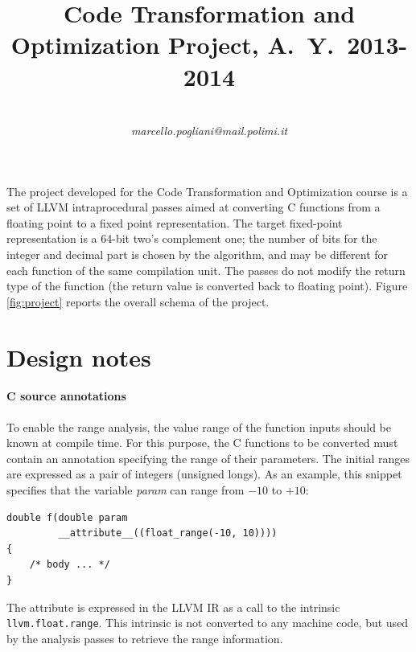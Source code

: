 \documentclass[9pt,twocolumn,a4paper]{scrartcl}
\title{Code Transformation and Optimization Project, A.~Y.~2013-2014}
\author{\realauthor \\[.3em]
        {\normalsize\itshape marcello.pogliani@mail.polimi.it}}
\begin{document}
\maketitle
\thispagestyle{empty}
\pagestyle{empty}

The project developed for the Code Transformation and Optimization course is a
set of LLVM intraprocedural passes aimed at converting C functions from a
floating point to a fixed point representation.
The target fixed-point representation is a 64-bit two's complement one; the
number of bits for the integer and decimal part is chosen by the algorithm, and
may be different for each function of the same compilation unit.
The passes do not modify the return type of the function (the return value is
converted back to floating point).
Figure \ref{fig:project} reports the overall schema of the project.

\section{Design notes}

\paragraph{C source annotations} To enable the range analysis, the value range
of the function inputs should be known at compile time.
For this purpose, the C functions to be converted must contain an annotation
specifying the range of their parameters.
The initial ranges are expressed as a pair of integers (unsigned longs).
As an example, this snippet specifies that the variable \emph{param} can range
from $-10$ to $+10$:
\begin{verbatim}
double f(double param
         __attribute__((float_range(-10, 10))))
{
    /* body ... */
}
\end{verbatim}
The attribute is expressed in the LLVM \ac{IR} as a call to the intrinsic
\verb|llvm.float.range|. This intrinsic is not converted to any machine code,
but used by the analysis passes to retrieve the range information.
\end{document}
